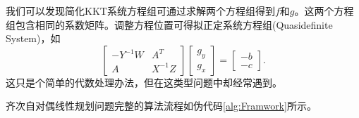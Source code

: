 \documentclass{ctexart}
\numberwithin{equation}{section} %
\begin{document}
我们可以发现简化KKT系统方程组可通过求解两个方程组得到$ f $和$ g $。这两个方程组包含相同的系数矩阵。调整方程位置可得拟正定系统方程组(Quasidefinite System)，如
\begin{equation}
	\begin{bmatrix}
	 -Y^{-1}W & A^T \\
	A & X^{-1}Z
	\end{bmatrix}
	\begin{bmatrix}
	g_y \\ g_x
	\end{bmatrix}
	= \begin{bmatrix}
	-b \\ -c
	\end{bmatrix}. \nonumber
\end{equation}
这只是个简单的代数处理办法，但在这类型问题中却经常遇到。

齐次自对偶线性规划问题完整的算法流程如伪代码\ref{alg:Framwork}所示。
\end{document}

